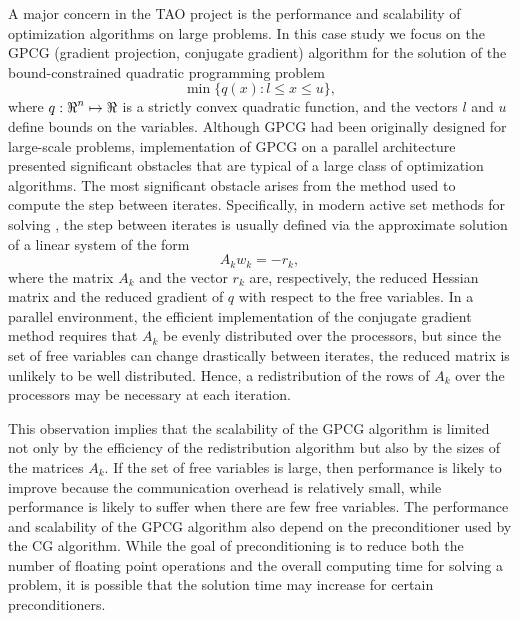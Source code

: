 A major concern in the TAO project \cite{tao-user-ref}
is the performance and scalability
of optimization algorithms on large problems.
In this case study
we focus on the GPCG
(gradient projection, conjugate gradient)
algorithm \cite{more-toraldo} 
for the solution
of the bound-constrained quadratic programming problem
\begin{equation} \label{def_bqp}
\min \{ q(x) : l \leq x \leq u \} ,
\end{equation}
where $q : \mbox{${\Re}$}^n \mapsto \mbox{${\Re}$} $ is a strictly convex quadratic function,
and the vectors $l$ and $u$ define bounds on the variables.
Although GPCG had been originally designed 
for large-scale problems, implementation of GPCG on a 
parallel architecture presented significant obstacles that
are typical of a large class of optimization algorithms.
The most significant obstacle arises from the 
method used to compute the step between iterates.
Specifically, in modern active set methods for solving
, the step between iterates is usually defined
via the approximate solution of a linear system of the form
\[
A_k w_k = - r_k ,
\]
where the matrix $ A_k $ and the vector $r_k$ are, respectively,
the reduced Hessian matrix and the reduced gradient
of $q$ with respect to the free variables.
In a parallel environment, the efficient implementation of the conjugate
gradient method requires that $A_k$ 
be evenly distributed over the processors,
but since the set of free variables can change
drastically between iterates, the reduced matrix is
unlikely to be well distributed. Hence,
a redistribution of the rows of $A_k$ over the processors
may be necessary at each iteration.

This observation implies that the
scalability of the GPCG algorithm is limited not only by the efficiency
of the redistribution algorithm but also by the sizes of
the matrices $A_k$. If the set of free variables is large,
then performance is likely to improve because the
communication overhead is relatively small, while performance is
likely to suffer when there are few free variables.
The performance and scalability of the GPCG algorithm also depend
on the preconditioner used by the CG algorithm.
While the goal of preconditioning is to reduce both the number of
floating point operations and the overall computing time for solving
a problem, it is possible that the solution time may increase
for certain preconditioners.

